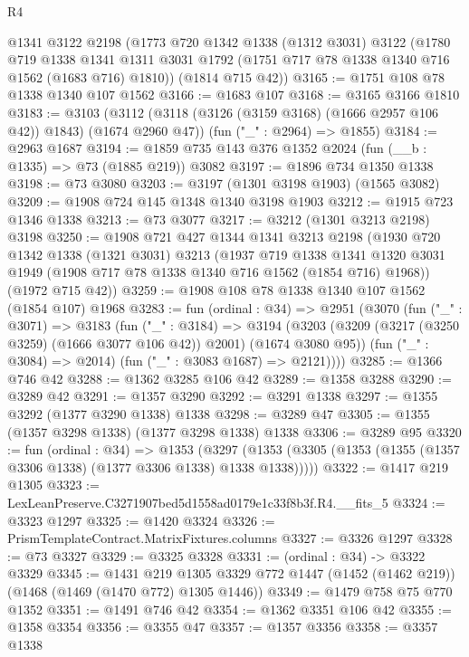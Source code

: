 \begin{lexlean}{R4}
\begin{coremodule}
    @1341
    @3122
    @2198
    (@1773
      @720
      @1342
      @1338
      (@1312 @3031)
      @3122
      (@1780
        @719
        @1338
        @1341
        @1311
        @3031
        @1792
        (@1751 @717 @78 @1338 @1340 @716 @1562 (@1683 @716) @1810))
      (@1814 @715 @42))
@3165 := @1751 @108 @78 @1338 @1340 @107 @1562
@3166 := @1683 @107
@3168 := @3165 @3166 @1810
@3183 := @3103
    (@3112 (@3118 (@3126 (@3159 @3168) (@1666 @2957 @106 @42)) @1843) (@1674 @2960 @47))
    (fun ("_" : @2964) => @1855)
@3184 := @2963 @1687
@3194 := @1859 @735 @143 @376 @1352 @2024 (fun (__b : @1335) => @73 (@1885 @219)) @3082
@3197 := @1896 @734 @1350 @1338
@3198 := @73 @3080
@3203 := @3197 (@1301 @3198 @1903) (@1565 @3082)
@3209 := @1908 @724 @145 @1348 @1340 @3198 @1903
@3212 := @1915 @723 @1346 @1338
@3213 := @73 @3077
@3217 := @3212 (@1301 @3213 @2198) @3198
@3250 := @1908
    @721
    @427
    @1344
    @1341
    @3213
    @2198
    (@1930
      @720
      @1342
      @1338
      (@1321 @3031)
      @3213
      (@1937
        @719
        @1338
        @1341
        @1320
        @3031
        @1949
        (@1908 @717 @78 @1338 @1340 @716 @1562 (@1854 @716) @1968))
      (@1972 @715 @42))
@3259 := @1908 @108 @78 @1338 @1340 @107 @1562 (@1854 @107) @1968
@3283 := fun (ordinal : @34) =>
  @2951
    (@3070
      (fun ("_" : @3071) =>
      @3183
        (fun ("_" : @3184) =>
        @3194
          (@3203 (@3209 (@3217 (@3250 @3259) (@1666 @3077 @106 @42)) @2001) (@1674 @3080 @95))
          (fun ("_" : @3084) => @2014)
          (fun ("_" : @3083 @1687) => @2121))))
@3285 := @1366 @746 @42
@3288 := @1362 @3285 @106 @42
@3289 := @1358 @3288
@3290 := @3289 @42
@3291 := @1357 @3290
@3292 := @3291 @1338
@3297 := @1355 @3292 (@1377 @3290 @1338) @1338
@3298 := @3289 @47
@3305 := @1355 (@1357 @3298 @1338) (@1377 @3298 @1338) @1338
@3306 := @3289 @95
@3320 := fun (ordinal : @34) =>
  @1353 (@3297 (@1353 (@3305 (@1353 (@1355 (@1357 @3306 @1338) (@1377 @3306 @1338) @1338 @1338)))))
@3322 := @1417 @219 @1305
@3323 := LexLeanPreserve.C3271907bed5d1558ad0179e1c33f8b3f.R4.__fits_5
@3324 := @3323 @1297
@3325 := @1420 @3324
@3326 := PrismTemplateContract.MatrixFixtures.columns
@3327 := @3326 @1297
@3328 := @73 @3327
@3329 := @3325 @3328
@3331 := (ordinal : @34) -> @3322 @3329
@3345 := @1431
    @219
    @1305
    @3329
    @772
    @1447
    (@1452 (@1462 @219))
    (@1468 (@1469 (@1470 @772) @1305 @1446))
@3349 := @1479 @758 @75 @770 @1352
@3351 := @1491 @746 @42
@3354 := @1362 @3351 @106 @42
@3355 := @1358 @3354
@3356 := @3355 @47
@3357 := @1357 @3356
@3358 := @3357 @1338

\end{coremodule}
\end{lexlean}

